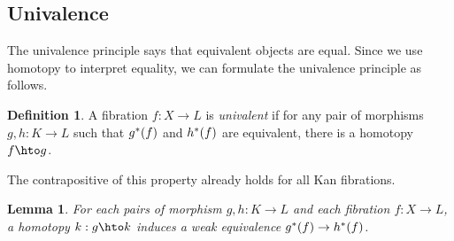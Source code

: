 \documentclass{amsart}
\theoremstyle{plain}
\newtheorem{lemma}[theorem]{Lemma}
\theoremstyle{definition}
\newtheorem{defin}[theorem]{Definition}
\begin{document}
\subsection{Univalence}
The univalence principle says that equivalent objects are equal. Since we use homotopy to interpret equality, we can formulate the univalence principle as follows.

\begin{defin} A fibration $f:X\to L$ is \emph{univalent} if for any pair of morphisms $g,h:K\to L$ such that $g^*(f)$ and $h^*(f)$ are equivalent, there is a homotopy $f\hto g$. \end{defin}

The contrapositive of this property already holds for all Kan fibrations.

\begin{lemma} For each pairs of morphism $g,h:K\to L$ and each fibration $f:X\to L$, a homotopy $k:g\hto k$ induces a weak equivalence $g^*(f) \to h^*(f)$. \end{lemma}%
\end{document}
